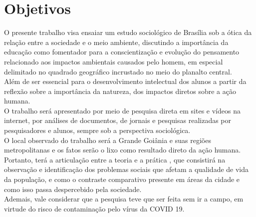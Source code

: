 \chapter{Objetivos}

O presente trabalho visa ensaiar um estudo sociológico de Brasília sob a ótica da relação entre a sociedade e o meio ambiente, discutindo a importância da educação como fomentador para a conscientização e evolução do pensamento relacionado aos impactos ambientais causados pelo homem, em especial delimitado no quadrado geográfico incrustado no meio do planalto central. \\

Além de ser essencial para o desenvolvimento intelectual dos alunos a partir da reflexão sobre a importância da natureza, dos impactos diretos sobre a ação humana. \\

O trabalho será apresentado por meio de pesquisa direta em sites e vídeos na internet, por análises de documentos, de jornais e pesquisas realizadas por pesquisadores e alunos, sempre sob a perspectiva sociológica. \\

O local observado do trabalho será a Grande Goiânia e suas regiões metropolitanas e os fatos serão o lixo como resultado direto da ação humana. Portanto, terá a articulação entre a teoria e a prática , que consistirá na observação e identificação dos problemas sociais que afetam a qualidade de vida da população, e como o contraste comparativo presente em áreas da cidade e como isso passa despercebido pela sociedade. \\

Ademais, vale considerar que a pesquisa teve que ser feita sem ir a campo, em virtude do risco de contaminação pelo vírus da COVID 19.